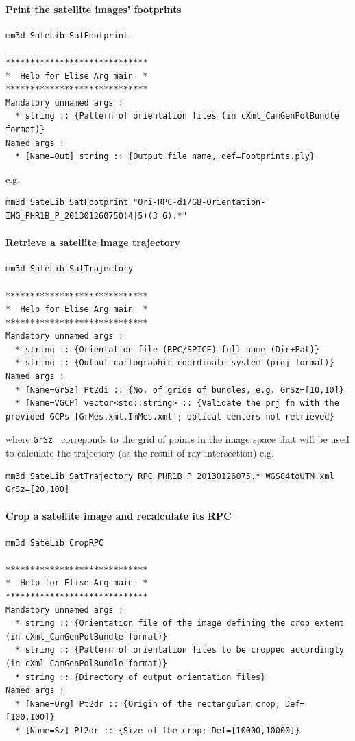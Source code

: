 \paragraph*{Print the satellite images' footprints}
%
\vspace{0.5cm}
%
\begin{verbatim}
mm3d SateLib SatFootprint

*****************************
*  Help for Elise Arg main  *
*****************************
Mandatory unnamed args : 
  * string :: {Pattern of orientation files (in cXml_CamGenPolBundle format)}
Named args : 
  * [Name=Out] string :: {Output file name, def=Footprints.ply}
\end{verbatim}
%
e.g. 
\begin{verbatim}
mm3d SateLib SatFootprint "Ori-RPC-d1/GB-Orientation-IMG_PHR1B_P_201301260750(4|5)(3|6).*"
\end{verbatim}


\paragraph*{Retrieve a satellite image trajectory}
%
\vspace{0.5cm}
%
\begin{verbatim}
mm3d SateLib SatTrajectory

*****************************
*  Help for Elise Arg main  *
*****************************
Mandatory unnamed args : 
  * string :: {Orientation file (RPC/SPICE) full name (Dir+Pat)}
  * string :: {Output cartographic coordinate system (proj format)}
Named args : 
  * [Name=GrSz] Pt2di :: {No. of grids of bundles, e.g. GrSz=[10,10]}
  * [Name=VGCP] vector<std::string> :: {Validate the prj fn with the provided GCPs [GrMes.xml,ImMes.xml]; optical centers not retrieved}
\end{verbatim}
where {\tt GrSz } correponds to the grid of points in the image space that will be used to calculate the trajectory (as the result of ray intersection)
e.g. 
\begin{verbatim}
mm3d SateLib SatTrajectory RPC_PHR1B_P_20130126075.* WGS84toUTM.xml  GrSz=[20,100]
\end{verbatim}

\paragraph*{Crop a satellite image and recalculate its RPC}
 

\begin{verbatim}
mm3d SateLib CropRPC

*****************************
*  Help for Elise Arg main  *
*****************************
Mandatory unnamed args : 
  * string :: {Orientation file of the image defining the crop extent (in cXml_CamGenPolBundle format)}
  * string :: {Pattern of orientation files to be cropped accordingly (in cXml_CamGenPolBundle format)}
  * string :: {Directory of output orientation files}
Named args : 
  * [Name=Org] Pt2dr :: {Origin of the rectangular crop; Def=[100,100]}
  * [Name=Sz] Pt2dr :: {Size of the crop; Def=[10000,10000]}
\end{verbatim}

